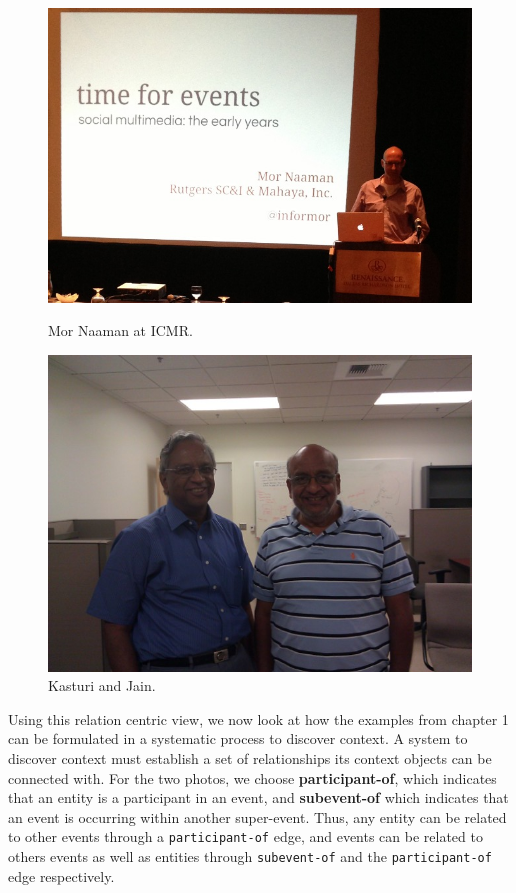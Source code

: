 \begin{figure}[t]
\begin{minipage}[b]{0.48\linewidth}
\centering
\includegraphics[width=\textwidth]{media/chapter2/naaman.jpg}
\caption{Mor Naaman at ICMR.}
\label{fig:naaman-icmr}
\end{minipage}
\hspace{0.5cm}
\begin{minipage}[b]{0.45\linewidth}
\centering
\includegraphics[width=\textwidth]{media/chapter1/kasturi-show.jpg}
\caption{Kasturi and Jain.}
\label{fig:example-kasturi-show}
\end{minipage}
\end{figure}

Using this relation centric view, we now look at how the examples from chapter 1 can be formulated in a systematic process to discover context. A system to discover context must establish a set of relationships its context objects can be connected with. For the two photos, we choose \textbf{participant-of}, which indicates that an entity is a participant in an event, and \textbf{subevent-of} which indicates that an event is occurring within another super-event. Thus, any entity can be related to other events through a \texttt{participant-of} edge, and events can be related to others events as well as entities through \texttt{subevent-of} and the \texttt{participant-of} edge respectively.

